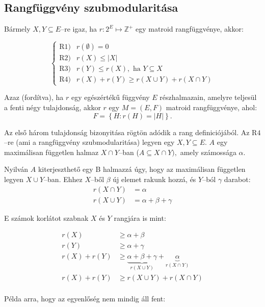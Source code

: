\subsection{Rangfüggvény szubmodularitása}
Bármely $X, Y \subseteq E$--re igaz, ha $r:2^E \mapsto \mathbb{Z}^+$ egy matroid
rangfüggvénye, akkor:

\[
\begin{cases}
\mbox{R1)}& r(\emptyset) = 0 \\
\mbox{R2)}& r(X) \leq |X| \\
\mbox{R3)}& r(Y) \leq r(X), \mbox{ ha } Y \subseteq X \\
\mbox{R4)}& r(X)+ r(Y) \geq r(X \cup Y) + r (X \cap Y)
\end{cases}
\]

Azaz (fordítva), ha $r$ egy egészértékű függvény $E$ részhalmazain, amelyre
teljesül a fenti négy tulajdonság, akkor $r$ egy $M=(E,F)$ matroid rangfüggvénye,
ahol:
\[F=\left\{ H : r(H)=|H| \right\}. \]

Az első három tulajdonság bizonyitása rögtön adódik a rang definiciójából. Az
R$4$--re (ami a rangfüggvény szubmodularitása) legyen egy $X,Y \subseteq E$. $A$
egy maximálisan független halmaz $X \cap Y$--ban ($A \subseteq X \cap Y),$ amely
számossága $\alpha$. 

Nyilván $A$ kiterjeszthető egy B halmazzá úgy, hogy az maximálisan független
legyen $X \cup Y$--ban. Ehhez $X$--ből $\beta$ új elemet rakunk hozzá, és
$Y$--ból $\gamma$ darabot:
\begin{align*}
r(X \cap Y) &= \alpha \\
r(X \cup Y) &= \alpha + \beta + \gamma
\end{align*}

E számok korlátot szabnak $X$ és $Y$ rangjára is mint: 

\begin{align*}
r(X) &\geq \alpha + \beta \\ 
r(Y) &\geq \alpha + \gamma \\
r(X) + r(Y) &\geq \underbrace{\alpha + \beta + \gamma}_{r(X \cup Y)} + \underbrace{\alpha}_{r(X \cap Y)} \\
r(X) + r(Y) &\geq r(X \cup Y) + r(X \cap Y) \\
\end{align*}

Példa arra, hogy az egyenlőség nem mindig áll fent:
\vspace{0.4cm}

